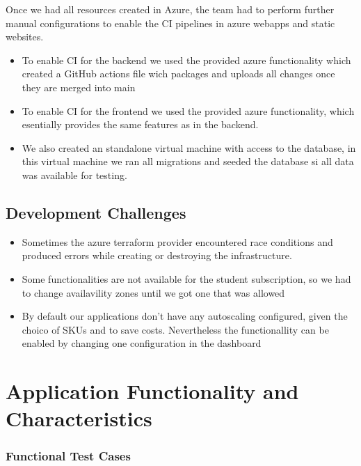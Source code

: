 \documentclass{llncs}
\begin{document}
Once we had all resources created in Azure, the team had to perform further manual configurations to enable the CI pipelines in azure webapps and static websites.
\begin{itemize}
    \item To enable CI for the backend we used the provided azure functionality which created a GitHub actions file wich packages and uploads all changes once they are merged into main
    \item To enable CI for the frontend we used the provided azure functionality, which esentially provides the same features as in the backend.
    \item We also created an standalone virtual machine with access to the database, in this virtual machine we ran all migrations and seeded the database si all data was available for testing.
\end{itemize}


\subsection{Development Challenges}
\begin{itemize}
    \item Sometimes the azure terraform provider encountered race conditions and produced errors while creating or destroying the infrastructure.
    \item Some functionalities are not available for the student subscription, so we had to change availavility zones until we got one that was allowed
    \item By default our applications don't have any autoscaling configured, given the choico of SKUs and to save costs.
          Nevertheless the functionallity can be enabled by changing one configuration in the dashboard
\end{itemize}

\section{Application Functionality and Characteristics}

\subsubsection{Functional Test Cases}
\end{document}
